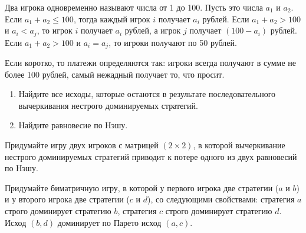 \begin{problem}
 Два игрока одновременно называют числа от 1 до 100. Пусть это числа  $a_{1} $  и  $a_{2} $. Если  $a_{1} +a_{2} \le 100$, тогда каждый игрок  $i$  получает  $a_{i} $  рублей. Если  $a_{1} +a_{2} >100$  и  $a_{i} <a_{j} $, то игрок  $i$  получает  $a_{i} $  рублей, а игрок  $j$  получает  $\left(100-a_{i} \right)$  рублей. Если  $a_{1} +a_{2} >100$  и  $a_{i} =a_{j} $, то игроки получают по 50 рублей. \par
Если коротко, то платежи определяются так: игроки всегда получают в сумме не более 100 рублей, самый нежадный получает то, что просит.
\begin{enumerate}
\item Найдите все исходы, которые остаются в результате последовательного вычеркивания нестрого доминируемых стратегий.

\item Найдите равновесие по Нэшу.
\end{enumerate}


\begin{sol}

\end{sol}
\end{problem}

\begin{problem}

Придумайте игру двух игроков с матрицей $\left(2\times 2\right)$, в которой вычеркивание нестрого доминируемых стратегий приводит к потере одного из двух равновесий по Нэшу.



\begin{sol}

\end{sol}
\end{problem}


\begin{problem}

Придумайте биматричную игру, в которой у первого игрока две стратегии ($a$  и  $b$) и у второго игрока две стратегии ($c$  и  $d$), со следующими свойствами: стратегия  $a$  строго доминирует стратегию  $b$, стратегия  $c$  строго доминирует стратегию  $d$. Исход  $\left(b,d\right)$  доминирует по Парето исход  $\left(a,c\right)$.



\begin{sol}

\end{sol}
\end{problem}


